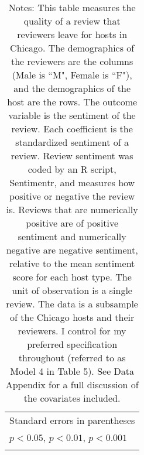 \begin{landscape}
{\begin{longtable}{l*{8}{c}}
\hline\hline
\multicolumn{9}{l}{\footnotesize Standard errors in parentheses}\\
\multicolumn{9}{l}{\footnotesize \sym{*} \(p<0.05\), \sym{**} \(p<0.01\), \sym{***} \(p<0.001\)}\\
\caption*{Notes: This table measures the quality of a review that reviewers leave for hosts in Chicago. The demographics of the reviewers are the columns (Male is ``M", Female is ``F"), and the demographics of the host are the rows. The outcome variable is the sentiment of the review. Each coefficient is the standardized sentiment of a review. Review sentiment was coded by an R script, Sentimentr, and measures how positive or negative the review is. Reviews that are numerically positive are of positive sentiment and numerically negative are negative sentiment, relative to the mean sentiment score for each host type. The unit of observation is a single review. The data is a subsample of the Chicago hosts and their reviewers. I control for my preferred specification throughout (referred to as Model 4 in Table 5). See Data Appendix for a full discussion of the covariates included.}
\end{longtable}
}

\end{landscape}

\normalsize
